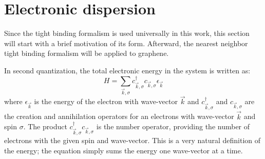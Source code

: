 \section{Electronic dispersion}
Since the tight binding formalism is used universally in this work, this section will start with a brief motivation of its form.
Afterward, the nearest neighbor tight binding formalism will be applied to graphene.

In second quantization, the total electronic energy in the system is written as:
\begin{equation*}
	H=\sum_{\vec{k},\sigma} c^{\dagger}_{\vec{k},\sigma} c_{\vec{k},\sigma} \epsilon_{\vec{k}}
\end{equation*}
where $\epsilon_{\vec{k}}$ is the energy of the electron with wave-vector $\vec{k}$ and $c^{\dagger}_{\vec{k},\sigma}$ and $c_{\vec{k},\sigma}$ are the creation and annihilation operators for an electrons with wave-vector $\vec{k}$ and spin $\sigma$.
The product $c^{\dagger}_{\vec{k},\sigma} c_{\vec{k},\sigma}$ is the number operator, providing the number of electrons with the given spin and wave-vector.
This is a very natural definition of the energy; the equation simply sums the energy one wave-vector at a time.

